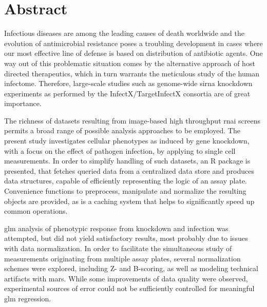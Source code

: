 \chapter{Abstract}

Infectious diseases are among the leading causes of death worldwide and the evolution of antimicrobial resistance poses a troubling development in cases where our most effective line of defense is based on distribution of antibiotic agents. One way out of this problematic situation comes by the alternative approach of host directed therapeutics, which in turn warrants the meticulous study of the human infectome. Therefore, large-scale studies such as genome-wide \acrshort{sirna} knockdown experiments as performed by the InfectX\slash TargetInfectX consortia are of great importance.

The richness of datasets resulting from image-based high throughput \acrshort{rnai} screens permits a broad range of possible analysis approaches to be employed. The present study investigates cellular phenotypes as induced by gene knockdown, with a focus on the effect of pathogen infection, by applying  to single cell measurements. In order to simplify handling of such datasets, an R package is presented, that fetches queried data from a centralized data store and produces data structures, capable of efficiently representing the logic of an assay plate. Convenience functions to preprocess, manipulate and normalize the resulting objects are provided, as is a caching system that helps to significantly speed up common operations.

\Acrshort{glm} analysis of phenotypic response from knockdown and infection was attempted, but did not yield satisfactory results, most probably due to issues with data normalization. In order to facilitate the simultaneous study of measurements originating from multiple assay plates, several normalization schemes were explored, including Z- and B-scoring, as well as modeling technical artifacts with \acrfull{mars}. While some improvements of data quality were observed, experimental sources of error could not be sufficiently controlled for meaningful \acrshort{glm} regression.